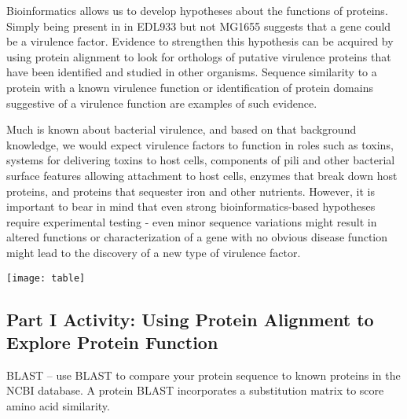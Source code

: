 Bioinformatics allows us to develop hypotheses about the functions of proteins.  Simply being present in in EDL933 but not MG1655 suggests that a gene could be a virulence factor.  Evidence to strengthen this hypothesis can be acquired by using protein alignment to look for orthologs of putative virulence proteins that have been identified and studied in other organisms.  Sequence similarity to a protein with a known virulence function or identification of protein domains suggestive of a virulence function are examples of such evidence.  

Much is known about bacterial virulence, and based on that background knowledge, we would expect virulence factors to function in roles such as toxins, systems for delivering toxins to host cells, components of pili and other bacterial surface features allowing attachment to host cells, enzymes that break down host proteins, and proteins that sequester iron and other nutrients.  However, it is important to bear in mind that even strong bioinformatics-based hypotheses require experimental testing - even minor sequence variations might result in altered functions or characterization of a gene with no obvious disease function might lead to the discovery of a new type of virulence factor.

\texttt{[image: table]}


\vspace*{-.1in}
\subsection*{Part I Activity:  Using Protein Alignment to Explore Protein Function}
\vspace*{-.1in} 
BLAST – use BLAST to compare your protein sequence to known proteins in the NCBI database.  A protein BLAST incorporates a substitution matrix to score amino acid similarity.  

